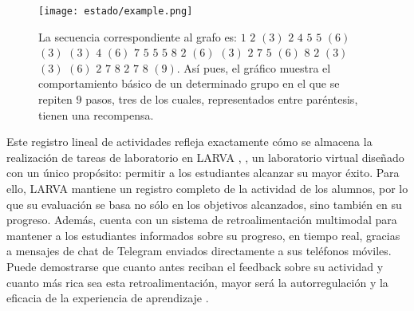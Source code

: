 \begin{figure}[H]
    \centering
    \texttt{[image: estado/example.png]}
    \caption{La secuencia correspondiente al grafo es: $1$ $2$ $(3)$ $2$ $4$ $5$ $5$ $(6)$ $(3)$ $(3)$ $4$ $(6)$ $7$ $5$ $5$ $5$ $8$ $2$ $(6)$ $(3)$ $2$ $7$ $5$ $(6)$ $8$ $2$ $(3)$ $(3)$ $(6)$ $2$ $7$ $8$ $2$ $7$ $8$ $(9)$. Así pues, el gráfico muestra el comportamiento básico de un determinado grupo en el que se repiten $9$ pasos, tres de los cuales, representados entre paréntesis, tienen una recompensa.}
    \label{fig:example}
\end{figure}

Este registro lineal de actividades refleja exactamente cómo se almacena la realización de tareas de laboratorio en LARVA \cite{Vidal_2022}, \cite{Vidal_2023}, un laboratorio virtual \cite{Vidal_2016} diseñado con un único propósito: permitir a los estudiantes alcanzar su mayor éxito. Para ello, LARVA mantiene un registro completo de la actividad de los alumnos, por lo que su evaluación se basa no sólo en los objetivos alcanzados, sino también en su progreso. Además, cuenta con un sistema de retroalimentación multimodal \cite{Vidal_2022} para mantener a los estudiantes informados sobre su progreso, en tiempo real, gracias a mensajes de chat de Telegram enviados directamente a sus teléfonos móviles. Puede demostrarse que cuanto antes reciban el feedback sobre su actividad y cuanto más rica sea esta retroalimentación, mayor será la autorregulación y la eficacia de la experiencia de aprendizaje \cite{Keller_1968}.

